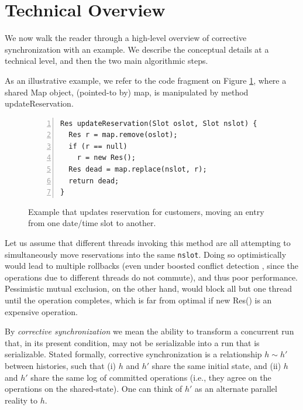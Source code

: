 \section{Technical Overview}

We now walk the reader through a high-level overview of corrective synchronization with an example. We  describe the conceptual details at a technical level, and then the two main algorithmic steps.

%
As an illustrative example, we refer to the code fragment
on Figure \ref{Fi:introMotivating},
where a shared {\sf Map} object, (pointed-to by) {\sf map}, is manipulated by method {\sf updateReservation}.
%
\begin{figure}
\centering
	\begin{lstlisting}[numbers=left,xleftmargin=15pt]
Res updateReservation(Slot oslot, Slot nslot) {
  Res r = map.remove(oslot);
  if (r == null)
    r = new Res();
  Res dead = map.replace(nslot, r);
  return dead;
}
	\end{lstlisting}
        \caption{\label{Fi:introMotivating} Example that updates reservation for customers, moving an entry from one date/time slot to another.}
\end{figure}
%
Let us assume that different threads invoking this method
are all attempting to simultaneously move reservations into the same \lstinline$nslot$.
Doing so optimistically would lead to multiple rollbacks (even under boosted conflict detection \cite{ppopp/HerlihyK08}, since the operations due to different threads do not commute), and thus poor performance. Pessimistic mutual exclusion, on the other hand, would block all but one thread until the operation completes, which is far from optimal if {\sf new Res()} is an expensive operation.



\newcommand\hrel{\sim}
%
By \emph{corrective synchronization} we mean the ability to transform a concurrent run that, in its present condition, may not be serializable into a run that is serializable. Stated formally, corrective synchronization is a relationship $h \hrel h'$ between histories, such that (i) $h$ and $h'$ share the same initial state, and (ii) $h$ and $h'$ share the same log of committed operations (i.e., they agree on the operations on the shared-state). One can think of $h'$ as an alternate parallel reality to $h$.

